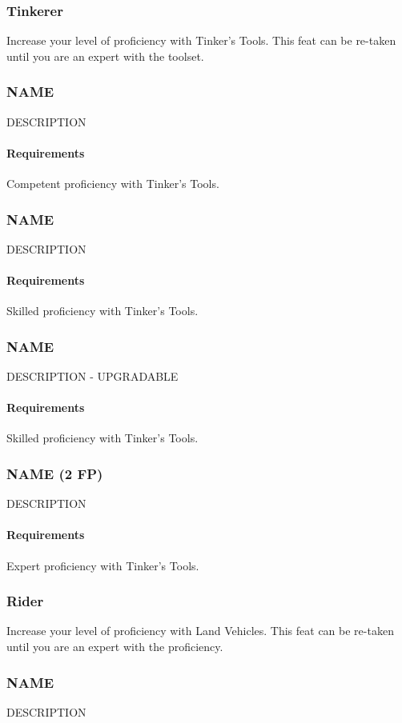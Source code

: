 \subsubsection{Tinkerer} \label{feat::tinkerer}
    Increase your level of proficiency with Tinker's Tools.
    This feat can be re-taken until you are an expert with the toolset.
\subsubsection{NAME} \label{feat::name}
    DESCRIPTION
    \paragraph{Requirements} Competent proficiency with Tinker's Tools.
\subsubsection{NAME} \label{feat::name}
    DESCRIPTION
    \paragraph{Requirements} Skilled proficiency with Tinker's Tools.
\subsubsection{NAME} \label{feat::name}
    DESCRIPTION - UPGRADABLE
    \paragraph{Requirements} Skilled proficiency with Tinker's Tools.
\subsubsection{NAME (2 FP)} \label{feat::name}
    DESCRIPTION
    \paragraph{Requirements} Expert proficiency with Tinker's Tools.
\subsubsection{Rider} \label{feat::rider}
    Increase your level of proficiency with Land Vehicles.
    This feat can be re-taken until you are an expert with the proficiency.
\subsubsection{NAME} \label{feat::name}
    DESCRIPTION

